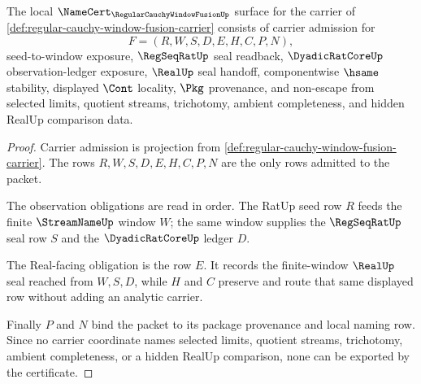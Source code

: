 \begin{theorem}
\label{thm:regular-cauchy-window-fusion-namecert-obligations}
The local $\NameCert_{\RegularCauchyWindowFusionUp}$ surface for the carrier of \autoref{def:regular-cauchy-window-fusion-carrier} consists of carrier admission for
$$
F=(R,W,S,D,E,H,C,P,N),
$$
seed-to-window exposure, $\RegSeqRatUp$ seal readback, $\DyadicRatCoreUp$ observation-ledger exposure, $\RealUp$ seal handoff, componentwise $\hsame$ stability, displayed $\Cont$ locality, $\Pkg$ provenance, and non-escape from selected limits, quotient streams, trichotomy, ambient completeness, and hidden RealUp comparison data.
\end{theorem}
\begin{proof}
Carrier admission is projection from \autoref{def:regular-cauchy-window-fusion-carrier}. The rows $R,W,S,D,E,H,C,P,N$ are the only rows admitted to the packet.

The observation obligations are read in order. The RatUp seed row $R$ feeds the finite $\StreamNameUp$ window $W$; the same window supplies the $\RegSeqRatUp$ seal row $S$ and the $\DyadicRatCoreUp$ ledger $D$.

The Real-facing obligation is the row $E$. It records the finite-window $\RealUp$ seal reached from $W,S,D$, while $H$ and $C$ preserve and route that same displayed row without adding an analytic carrier.

Finally $P$ and $N$ bind the packet to its package provenance and local naming row. Since no carrier coordinate names selected limits, quotient streams, trichotomy, ambient completeness, or a hidden RealUp comparison, none can be exported by the certificate.
\end{proof}

